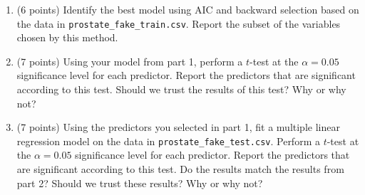 \documentclass[
]{article}
\begin{document}
\begin{enumerate}
\def\labelenumi{\arabic{enumi}.}
\item
  (6 points) Identify the best model using AIC and backward selection
  based on the data in \texttt{prostate\_fake\_train.csv}. Report the
  subset of the variables chosen by this method.
\item
  (7 points) Using your model from part 1, perform a \(t\)-test at the
  \(\alpha = 0.05\) significance level for each predictor. Report the
  predictors that are significant according to this test. Should we
  trust the results of this test? Why or why not?
\item
  (7 points) Using the predictors you selected in part 1, fit a multiple
  linear regression model on the data in
  \texttt{prostate\_fake\_test.csv}. Perform a \(t\)-test at the
  \(\alpha = 0.05\) significance level for each predictor. Report the
  predictors that are significant according to this test. Do the results
  match the results from part 2? Should we trust these results? Why or
  why not?
\end{enumerate}
\end{document}
